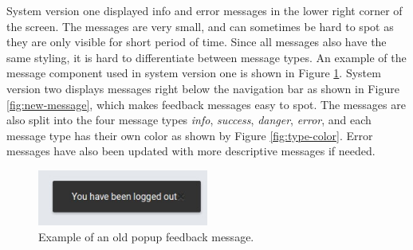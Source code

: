 System version one displayed info and error messages in the lower right corner of the screen. The messages are very small, and can sometimes be hard to spot as they are only visible for short period of time. Since all messages also have the same styling, it is hard to differentiate between message types. An example of the message component used in system version one is shown in Figure \ref{fig:old-message}. System version two displays messages right below the navigation bar as shown in Figure \ref{fig:new-message}, which makes feedback messages easy to spot. The messages are also split into the four message types \textit{info}, \textit{success}, \textit{danger}, \textit{error}, and each message type has their own color as shown by Figure \ref{fig:type-color}. Error messages have also been updated with more descriptive messages if needed. \\

\begin{figure}[t!]
    \centering
    \includegraphics[width=0.5\textwidth]{figs/old_message.jpg}
    \caption[Example of an old popup feedback message]{Example of an old popup feedback message.}
    \label{fig:old-message}
\end{figure}


